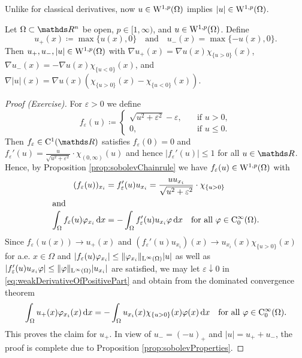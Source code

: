 Unlike for classical derivatives, now $u \in \mathrm{W}^{1,p}(\Omega)$ implies $|u| \in \mathrm{W}^{1,p}(\Omega)$.

\begin{cor}
  Let $\Omega \subset \R^n$ be open, $p \in [1,\infty)$, and $u \in \mathrm{W}^{1,p}(\Omega)$.
  Define 
  $$u_+(x) \coloneqq \max\{u(x),0\} \quad\text{and}\quad u_-(x) = \max\{-u(x),0\}.$$
  Then $u_+, u_-,|u| \in \mathrm{W}^{1,p}(\Omega)$ with
    $\nabla u_+(x) = \nabla u(x) \chi_{\{ u > 0\}}(x)$, $\nabla u_-(x) = -\nabla u(x) \chi_{\{ u < 0\}}(x)$, and $\nabla|u|(x) = \nabla u(x) \left( \chi_{\{ u > 0\} } (x) - \chi_{\{u < 0\}} (x) \right)$.
\end{cor}

\begin{proof}[Proof (Exercise)]
  For $\varepsilon > 0$ we define
  $$
  f_\varepsilon(u) \coloneqq
  \begin{cases}
    \sqrt{u^2 + \varepsilon^2} - \varepsilon, &\quad\text{if } u > 0,\\
    0, &\quad\text{if } u \leq 0.
  \end{cases}
  $$
  Then $f_\varepsilon \in \CC^1(\R)$ satisfies $f_\varepsilon(0) = 0$ and $f_\varepsilon'(u) = \frac{u}{\sqrt{u^2 + \varepsilon^2}} \cdot \chi_{(0,\infty)}(u)$ and hence $|f_\varepsilon'(u)| \leq 1$ for all $u \in \R$.
  Hence, by Proposition \ref{prop:sobolevChainrule} we have $f_\varepsilon(u) \in \mathrm{W}^{1,p}(\Omega)$ with 
  \begin{align}
    (f_\varepsilon(u))_{x_i} &= f_\varepsilon'(u) u_{x_i} = \frac{u u_{x_i}}{\sqrt{u^2 + \varepsilon^2}} \cdot \chi_{\{ u > 0\}}\nonumber\\
    \intertext{and}
    \label{eq:weakDerivativeOfPositivePart}
    \int_\Omega f_\varepsilon(u) \varphi_{x_i} \, {\operatorname{d}\!{x}}
    &= - \int_\Omega f_\varepsilon'(u) u_{x_i} \varphi \, {\operatorname{d}\!{x}} \quad\text{for all } \varphi \in \mathrm{C}_0^\infty(\Omega).
  \end{align}
  Since $f_\varepsilon(u(x)) \to u_+(x)$ and $(f_\varepsilon'(u) u_{x_i})(x) \to u_{x_i}(x)\chi_{\{u > 0\}}(x)$ for a.e. $x \in \Omega$ and $|f_\varepsilon(u)\varphi_{x_i}| \leq \| \varphi_{x_i}\|_{\mathrm{L}^\infty(\Omega)} |u|$ as well as $|f_\varepsilon'(u) u_{x_i} \varphi|\leq \|\varphi\|_{\mathrm{L}^\infty(\Omega)} |u_{x_i}|$ are satisfied, we may let $\varepsilon\downarrow 0$ in \eqref{eq:weakDerivativeOfPositivePart} and obtain from the dominated convergence theorem
  $$
  \int_\Omega u_+(x) \varphi_{x_i}(x) \, {\operatorname{d}\!{x}}
  = - \int_\Omega u_{x_i}(x) \chi_{\{u > 0\}}(x) \varphi(x) \, {\operatorname{d}\!{x}} \quad\text{for all } \varphi \in \mathrm{C}_0^\infty(\Omega).
  $$
  This proves the claim for $u_+$.
  In view of $u_- = (-u)_+$ and $|u| = u_+ + u_-$, the proof is complete due to Proposition \ref{prop:sobolevProperties}.
\end{proof}

